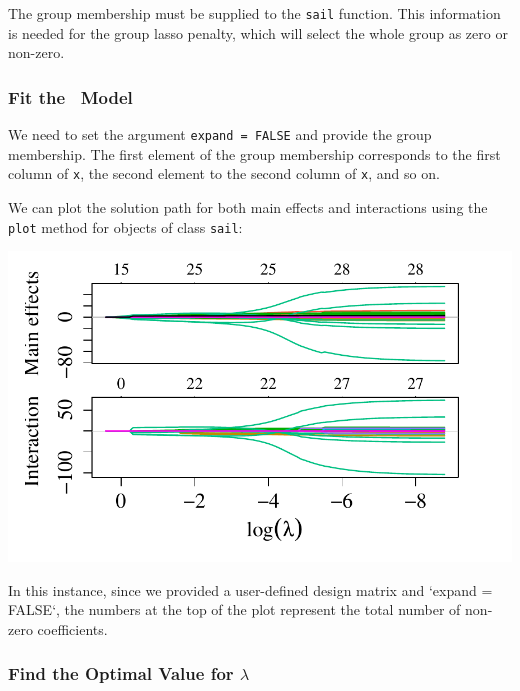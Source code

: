 The group membership must be supplied to the \texttt{sail} function. This information is needed for the group lasso penalty, which will select the whole group as zero or non-zero.

\subsubsection{Fit the \sail ~Model}

We need to set the argument \texttt{expand = FALSE} and provide the group membership. The first element of the group membership corresponds to the first column of \texttt{x}, the second element to the second column of \texttt{x}, and so on. 



We can plot the solution path for both main effects and interactions using the \texttt{plot} method for objects of class \texttt{sail}:

\begin{knitrout}\scriptsize
	\color{fgcolor}
	
	{\centering \includegraphics[width=1\linewidth]{figs/sail-expand-false-1} 
		
	}
	
	
	
\end{knitrout}

In this instance, since we provided a user-defined design matrix and `expand = FALSE`, the numbers at the top of the plot represent the total number of non-zero coefficients. 


\subsubsection{Find the Optimal Value for $\lambda$}

